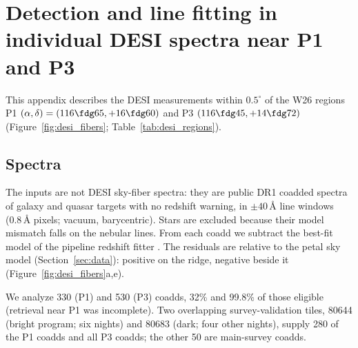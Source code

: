 
\section{Detection and line fitting in individual DESI spectra near P1 and P3}\label{sec:appendix-desi}

This appendix describes the DESI measurements within $0.5^\circ$ of the W26 regions P1 $(\alpha,\delta)=(116\fdg65,+16\fdg60)$ and P3 $(116\fdg45,+14\fdg72)$ (Figure~\ref{fig:desi_fibers}; Table~\ref{tab:desi_regions}).

\subsection{Spectra}

The inputs are not DESI sky-fiber spectra: they are public DR1 coadded spectra \citep{DESI2026} of galaxy and quasar targets with no redshift warning, in $\pm40$\,\AA{} line windows (0.8\,\AA{} pixels; vacuum, barycentric). Stars are excluded because their model mismatch falls on the nebular lines. From each coadd we subtract the best-fit model of the pipeline redshift fitter \citep{Guy2023}. The residuals are relative to the petal sky model (Section~\ref{sec:data}): positive on the ridge, negative beside it (Figure~\ref{fig:desi_fibers}a,e).

We analyze 330 (P1) and 530 (P3) coadds, 32\% and 99.8\% of those eligible (retrieval near P1 was incomplete). Two overlapping survey-validation tiles, 80644 (bright program; six nights) and 80683 (dark; four other nights), supply 280 of the P1 coadds and all P3 coadds; the other 50 are main-survey coadds.

